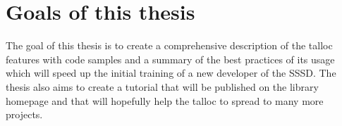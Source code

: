\section{Goals of this thesis}

The goal of this thesis is to create a comprehensive description of the talloc
features with code samples and a summary of the best practices of its usage
which will speed up the initial training of a new developer of the SSSD. The
thesis also aims to create a tutorial that will be published on the library
homepage and that will hopefully help the talloc to spread to many more projects.

% 
% 
% 
